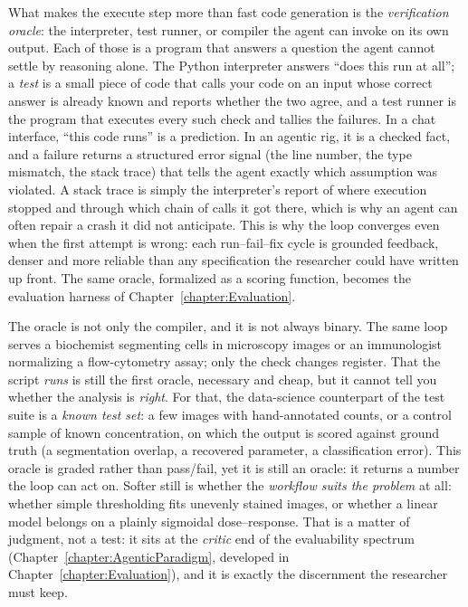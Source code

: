 What makes the execute step more than fast code generation is the \emph{verification oracle}: the interpreter, test runner, or compiler the agent can invoke on its own output.
Each of those is a program that answers a question the agent cannot settle by reasoning alone.
The Python interpreter answers ``does this run at all'';
a \emph{test} is a small piece of code that calls your code on an input whose correct answer is already known and reports whether the two agree,
and a test runner is the program that executes every such check and tallies the failures.
In a chat interface, ``this code runs'' is a prediction.
In an agentic rig, it is a checked fact, and a failure returns a structured error signal (the line number, the type mismatch, the stack trace) that tells the agent exactly which assumption was violated.
A stack trace is simply the interpreter's report of where execution stopped and through which chain of calls it got there, which is why an agent can often repair a crash it did not anticipate.
This is why the loop converges even when the first attempt is wrong: each run--fail--fix cycle is grounded feedback, denser and more reliable than any specification the researcher could have written up front.
The same oracle, formalized as a scoring function, becomes the evaluation harness of Chapter~\ref{chapter:Evaluation}.

\begin{remark}
The oracle is not only the compiler, and it is not always binary.
The same loop serves a biochemist segmenting cells in microscopy images or an immunologist normalizing a flow-cytometry assay; only the check changes register.
That the script \emph{runs} is still the first oracle, necessary and cheap, but it cannot tell you whether the analysis is \emph{right}.
For that, the data-science counterpart of the test suite is a \emph{known test set}: a few images with hand-annotated counts, or a control sample of known concentration, on which the output is scored against ground truth (a segmentation overlap, a recovered parameter, a classification error).
This oracle is graded rather than pass/fail, yet it is still an oracle: it returns a number the loop can act on.
Softer still is whether the \emph{workflow suits the problem} at all: whether simple thresholding fits unevenly stained images, or whether a linear model belongs on a plainly sigmoidal dose--response.
That is a matter of judgment, not a test: it sits at the \emph{critic} end of the evaluability spectrum (Chapter~\ref{chapter:AgenticParadigm}, developed in Chapter~\ref{chapter:Evaluation}), and it is exactly the discernment the researcher must keep.
\end{remark}

